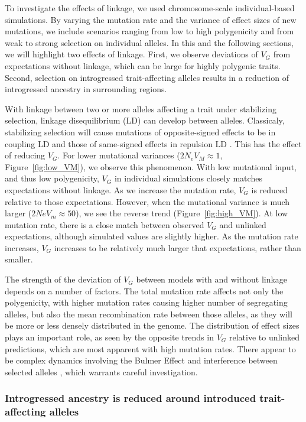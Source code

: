 \documentclass{article}
\begin{document}
To investigate the effects of linkage, we used chromosome-scale
individual-based simulations. By varying the mutation rate and the variance of
effect sizes of new mutations, we include scenarios ranging from low to high
polygenicity and from weak to strong selection on individual alleles. In this
and the following sections, we will highlight two effects of linkage. First,
we observe deviations of $V_G$ from expectations without linkage, which can be
large for highly polygenic traits. Second, selection on introgressed
trait-affecting alleles results in a reduction of introgressed ancestry in
surrounding regions.

With linkage between two or more alleles affecting a trait under stabilizing
selection, linkage disequilibrium (LD) can develop between alleles. Classicaly,
stabilizing selection will cause mutations of opposite-signed effects to be in
coupling LD and those of same-signed effects in repulsion LD
\citep{bulmer1971effect}. This has the effect of reducing $V_G$. For lower
mutational variances ($2N_e V_M\approx1$, Figure~\ref{fig:low_VM}), we observe
this phenomenon. With low mutational input, and thus low polygenicity, $V_G$ in
individual simulations closely matches expectations without linkage. As we
increase the mutation rate, $V_G$ is reduced relative to those expectations.
However, when the mutational variance is much larger ($2Ne V_m \approx 50$), we
see the reverse trend (Figure~\ref{fig:high_VM}). At low mutation rate, there
is a close match between observed $V_G$ and unlinked expectations, although
simulated values are slightly higher. As the mutation rate increases, $V_G$
increases to be relatively much larger that expectations, rather than smaller.

The strength of the deviation of $V_G$ between models with and without linkage
depends on a number of factors. The total mutation rate affects not only the
polygenicity, with higher mutation rates causing higher number of segregating
alleles, but also the mean recombination rate between those alleles, as they
will be more or less densely distributed in the genome. The distribution of
effect sizes plays an important role, as seen by the opposite trends in $V_G$
relative to unlinked predictions, which are most apparent with high mutation
rates. There appear to be complex dynamics involving the Bulmer Effect
\citep{bulmer1971effect} and interference between selected alleles
\citep{hill1966effect}, which warrants careful investigation.

\subsubsection*{Introgressed ancestry is reduced around introduced trait-affecting alleles}
\end{document}

